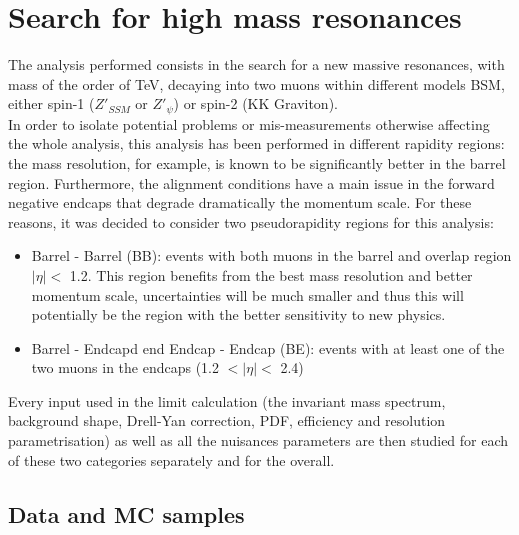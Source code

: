 \chapter{Search for high mass resonances}
\label{Chapter5}
The analysis performed consists in the search for a new massive resonances, with mass of the order of TeV, decaying into two muons within different models BSM, either spin-1 (\eg $Z'_{SSM}$ or $Z'_{\psi}$) or spin-2 (\eg KK Graviton).  \\
In order to isolate potential problems or mis-measurements otherwise affecting the whole analysis, this analysis has been performed in different rapidity regions: the mass resolution, for example, is known to be significantly better in the barrel region. Furthermore, the alignment conditions have a main issue in the forward negative endcaps that degrade dramatically the momentum scale. 
For these reasons, it was decided to consider two pseudorapidity regions for this analysis:
\begin{itemize}
\item Barrel - Barrel (BB): events with both muons in the barrel and overlap region $|\eta| <$ 1.2. This region benefits from the best mass resolution and better momentum scale, uncertainties will be much smaller and thus this will potentially be the region with the better sensitivity to new physics.
\item Barrel - Endcapd end Endcap - Endcap (BE): events with at least one of the two muons in the endcaps (1.2 $<|\eta| <$ 2.4)
\end{itemize}
Every input used in the limit calculation (\eg the invariant mass spectrum, background shape, Drell-Yan correction, PDF, efficiency and resolution parametrisation) as well as all the nuisances parameters are then studied for each of these two categories separately and for the overall.

\section{Data and MC samples}

